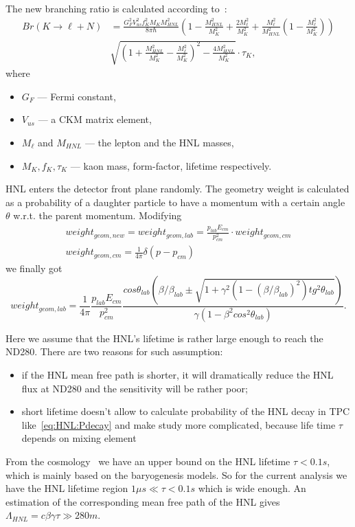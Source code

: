 \documentclass[../main.tex]{subfiles}
\begin{document}
The new branching ratio is calculated according to~\cite{Gorbunov2007}:
\begin{equation}
    \begin{split}
    Br(K\rightarrow \ell+N)&=\frac{G_F^2 V_{us}^2 f_K^2 M_K M_{HNL}^2}{8\pi\hbar}\left(1-\frac{M_{HNL}^2}{M_K^2}+\frac{2M_\ell ^2}{M_K^2}+\frac{M_\ell^2}{M_{HNL}^2}\left(1-\frac{M_\ell^2}{M_K^2}\right)\right) \\
&\sqrt{\left(1+\frac{M_{HNL}^2}{M_K^2}-\frac{M_\ell^2}{M_K^2}\right)^2-\frac{4M_{HNL}^2}{M_K^2}} \cdot\tau_K,
    \end{split}
    \label{eq:HNL:Kdecay}
\end{equation}
where
\begin{itemize}
\item $G_F$ --- Fermi constant,
\item $V_{us}$ --- a CKM matrix element,
\item $M_\ell$ and $M_{HNL}$ --- the lepton and the HNL masses,
\item $M_K, f_K, \tau_K$ --- kaon mass, form-factor, lifetime respectively.
\end{itemize}

HNL enters the detector front plane randomly. The geometry weight is calculated as a probability of a daughter particle to have a momentum with a certain angle $\theta$ w.r.t. the parent momentum. Modifying
\begin{eqnarray}
    weight_{geom,new}=weight_{geom, lab}=\frac{p_{lab}E_{cm}}{p_{cm}^2}\cdot weight_{geom,cm}
    \nonumber \\
    weight_{geom, cm} = \frac{1}{4\pi}\delta\left(p-p_{cm}\right)
\end{eqnarray}
we finally got
\begin{equation}
    weight_{geom, lab}=\frac{1}{4\pi}\frac{p_{lab}E_{cm}}{p_{cm}^2}\frac{cos\theta_{lab}\left(\beta/\beta_{lab}\pm\sqrt{1+\gamma^2\left(1-\left(\beta/\beta_{lab}\right)^2\right)tg^2\theta_{lab}}\right)}{\gamma\left(1-\beta^{2}cos^{2}\theta_{lab}\right)}.
    \label{eq:HNL:lorentz}
\end{equation}

Here we assume that the HNL's lifetime is rather large enough to reach the ND280. There are two reasons for such assumption:
\begin{itemize}
    \item if the HNL mean free path is shorter, it will dramatically reduce the HNL flux at ND280 and the sensitivity will be rather poor;
    \item short lifetime doesn't allow to calculate probability of the HNL decay in TPC like~\autoref{eq:HNL:Pdecay} and make study more complicated, because life time $\tau$ depends on mixing element
\end{itemize}
From the cosmology~\cite{Gorbunov2007} we have an upper bound on the HNL lifetime  $\tau < 0.1s$, which is mainly based on the baryogenesis models. So for the current analysis we have the HNL lifetime region $1\mu s\ll\tau<0.1s$ which is wide enough. An estimation of the corresponding mean free path of the HNL gives $\Lambda_{HNL}=c\beta\gamma\tau\gg280 m$.
\end{document}
